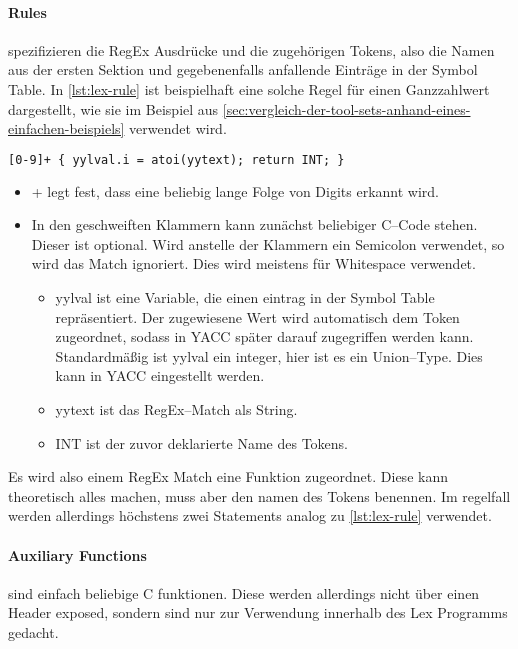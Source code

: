 \paragraph{Rules} spezifizieren die \ac{RegEx} Ausdrücke und die zugehörigen Tokens, also die Namen aus der ersten Sektion und gegebenenfalls anfallende Einträge in der Symbol Table.
In \autoref{lst:lex-rule} ist beispielhaft eine solche Regel für einen Ganzzahlwert dargestellt, wie sie im Beispiel aus \autoref{sec:vergleich-der-tool-sets-anhand-eines-einfachen-beispiels} verwendet wird.
\begin{lstlisting}[label={lst:lex-rule},caption={Lex Regel},language=lex]
[0-9]+ { yylval.i = atoi(yytext); return INT; }
\end{lstlisting}
\begin{itemize}
    \item {\ttfamily [0-9]+} legt fest, dass eine beliebig lange Folge von Digits erkannt wird.
    \item In den geschweiften Klammern kann zunächst beliebiger C--Code stehen.
    Dieser ist optional.
    Wird anstelle der Klammern ein Semicolon verwendet, so wird das Match ignoriert.
    Dies wird meistens für Whitespace verwendet.
    \begin{itemize}
        \item {\ttfamily yylval} ist eine Variable, die einen eintrag in der Symbol Table repräsentiert.
        Der zugewiesene Wert wird automatisch dem Token zugeordnet, sodass in \ac{YACC} später darauf zugegriffen werden kann.
        Standardmäßig ist {\ttfamily yylval} ein integer, hier ist es ein Union--Type.
        Dies kann in \ac{YACC} eingestellt werden.
        \item {\ttfamily yytext} ist das \acs{RegEx}--Match als String.
        \item {\ttfamily INT} ist der zuvor deklarierte Name des Tokens.
    \end{itemize}
\end{itemize}

Es wird also einem \ac{RegEx} Match eine Funktion zugeordnet.
Diese kann theoretisch alles machen, muss aber den namen des Tokens benennen.
Im regelfall werden allerdings höchstens zwei Statements analog zu \autoref{lst:lex-rule} verwendet.

\paragraph{Auxiliary Functions} sind einfach beliebige C funktionen.
Diese werden allerdings nicht über einen Header exposed, sondern sind nur zur Verwendung innerhalb des Lex Programms gedacht.

